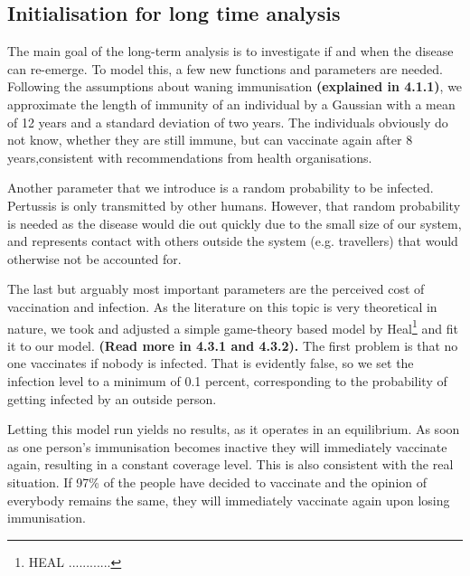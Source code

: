 \documentclass[11pt]{article}
\begin{document}
\subsection{Initialisation for long time analysis}
The main goal of the long-term analysis is to investigate if and when the disease can re-emerge. To model this, a few new functions and parameters are needed. Following the assumptions about waning immunisation \textbf{(explained in 4.1.1)}, we approximate the length of immunity of an individual by a Gaussian with a mean of 12 years and a standard deviation of two years. The individuals obviously do not know, whether they are still immune, but can vaccinate again after 8 years,consistent with recommendations from health organisations. 

Another parameter that we introduce is a random probability to be infected. Pertussis is only transmitted by other humans. However, that random probability is needed as the disease would die out quickly due to the small size of our system, and represents contact with others outside the system (e.g. travellers) that would otherwise not be accounted for. 

The last but arguably most important parameters are the perceived cost of vaccination and infection. As the literature on this topic is very theoretical in nature, we took and adjusted a simple game-theory based model by Heal\footnote{HEAL ............} and fit it to our model. \textbf{(Read more in 4.3.1 and 4.3.2).} The first problem is that no one vaccinates if nobody is infected. That is evidently false, so we set the infection level to a minimum of 0.1 percent, corresponding to the probability of getting infected by an outside person.
\vspace{14px}


Letting this model run yields no results, as it operates in an equilibrium. As soon as one person’s immunisation becomes inactive they will immediately vaccinate again, resulting in a constant coverage level. This is also consistent with the real situation. If 97\% of the people have decided to vaccinate and the opinion of everybody remains the same, they will immediately vaccinate again upon losing immunisation.
\vspace{14px}
\end{document}
